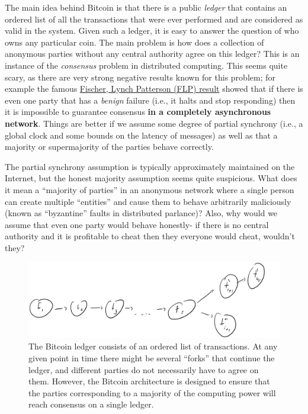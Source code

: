 The main idea behind Bitcoin is that there is a public \emph{ledger}
that contains an ordered list of all the transactions that were ever
performed and are considered as valid in the system. Given such a
ledger, it is easy to answer the question of who owns any particular
coin. The main problem is how does a collection of anonymous parties
without any central authority agree on this ledger? This is an instance
of the \emph{consensus} problem in distributed computing. This seems
quite scary, as there are very strong negative results known for this
problem; for example the famous
\href{http://the-paper-trail.org/blog/a-brief-tour-of-flp-impossibility/}{Fischer,
Lynch Patterson (FLP) result} showed that if there is even one party
that has a \emph{benign} failure (i.e., it halts and stop responding)
then it is impossible to guarantee consensus \textbf{in a completely
asynchronous network}. Things are better if we assume some degree of
partial synchrony (i.e., a global clock and some bounds on the latency
of messages) as well as that a majority or supermajority of the parties
behave correctly.

The partial synchrony assumption is typically approximately maintained
on the Internet, but the honest majority assumption seems quite
suspicious. What does it mean a ``majority of parties'' in an anonymous
network where a single person can create multiple ``entities'' and cause
them to behave arbitrarily maliciously (known as ``byzantine'' faults in
distributed parlance)? Also, why would we assume that even one party
would behave honestly- if there is no central authority and it is
profitable to cheat then they everyone would cheat, wouldn't they?

\begin{figure}
\centering
\includegraphics[width=\textwidth, height=0.25\paperheight, keepaspectratio]{../figure/Bitcoin_ledger.jpg}
\caption{The Bitcoin ledger consists of an ordered list of transactions.
At any given point in time there might be several ``forks'' that
continue the ledger, and different parties do not necessarily have to
agree on them. However, the Bitcoin architecture is designed to ensure
that the parties corresponding to a majority of the computing power will
reach consensus on a single ledger.}
\label{ledgerfig}
\end{figure}

